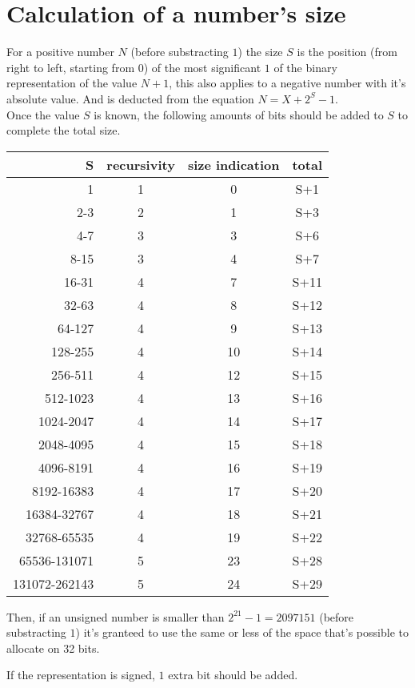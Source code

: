 \documentclass[a4paper,11pt]{article}
\begin{document}
\section{Calculation of a number's size}
For a positive number $N$ (before substracting $1$) the size $S$ is the position (from right to left, starting from $0$) of the most significant $1$ of the binary representation of the value $N+1$, this also applies to a negative number with it's absolute value. And is deducted from the equation $N = X+2^{S}-1$.
\\ Once the value $S$ is known, the following amounts of bits should be added to $S$ to complete the total size.
\begin{center}
	\begin{tabular}{ r || c| c || c}
		S & recursivity & size indication & total \\
		\hline 
		1 & 1 & 0 & S+1 \\
		2-3 & 2 & 1 & S+3 \\
		4-7 & 3 & 3 & S+6 \\
		8-15 & 3 & 4 & S+7 \\
		16-31 & 4 & 7 & S+11 \\
		32-63 & 4 & 8 & S+12 \\
		64-127 & 4 & 9 & S+13 \\
		128-255 & 4 & 10 & S+14 \\
		256-511 & 4 & 12 & S+15 \\
		512-1023 & 4 & 13 & S+16 \\
		1024-2047 & 4 & 14 & S+17 \\
		2048-4095 & 4 & 15 & S+18 \\
		4096-8191 & 4 & 16 & S+19 \\
		8192-16383 & 4 & 17 & S+20 \\
		16384-32767 & 4 & 18 & S+21 \\
		32768-65535 & 4 & 19 & S+22 \\	  
		65536-131071 & 5 & 23 & S+28 \\
		131072-262143 & 5 & 24 & S+29
	\end{tabular}
Then, if an unsigned number is smaller than $2^{21}-1=2097151$ (before substracting $1$) it's granteed to use the same or less of the space that's possible to allocate on 32 bits.
\end{center} 
	If the representation is signed, $1$ extra bit should be added.
\end{document}
